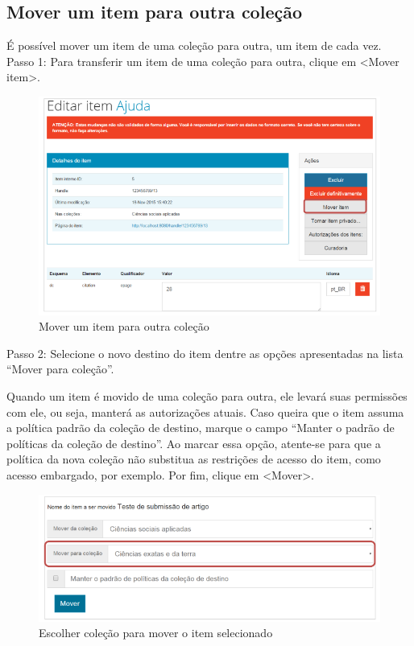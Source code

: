 \documentclass[12pt,hidelinks]{article}
\begin{document}
\newpage

    \subsection{Mover um item para outra coleção}
    
    É possível mover um item de uma coleção para outra, um item de cada vez. \\
    
    Passo 1: Para transferir um item de uma coleção para outra, clique em <Mover item>.
    
    \begin{figure}[!htp]
                \centering
                \includegraphics[scale=0.8]{figura/Figura104.png}
                \caption{Mover um item para outra coleção}
            \label{Rotulo}
        \end{figure}
    
    Passo 2: Selecione o novo destino do item dentre as opções apresentadas na lista “Mover para coleção”.
    
    \singlespacing
    
    Quando um item é movido de uma coleção para outra, ele levará suas permissões com ele, ou seja, manterá as autorizações atuais. Caso queira que o item assuma a política padrão da coleção de destino, marque o campo “Manter o padrão de políticas da coleção de destino”. Ao marcar essa opção, atente-se para que a política da nova coleção não substitua as restrições de acesso do item, como acesso embargado, por exemplo. Por fim, clique em <Mover>.
    
     \begin{figure}[!htp]
                \centering
                \includegraphics[scale=0.8]{figura/Figura105.png}
                \caption{Escolher coleção para mover o item selecionado}
            \label{Rotulo}
        \end{figure}
\end{document}
